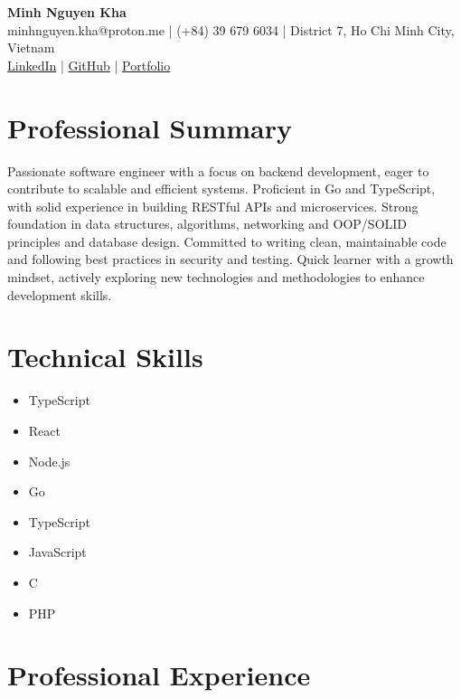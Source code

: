 \documentclass[11pt,a4paper]{article}
\begin{document}
\begin{center}
  {\LARGE \textbf{ Minh Nguyen Kha }}\\[0.2cm]
  minhnguyen.kha@proton.me | (+84) 39 679 6034 | District 7, Ho Chi Minh City, Vietnam\\
  \href{ https://linkedin.com/in/minh-nguyen-kha }{LinkedIn}
   | \href{ https://github.com/MinhNguyenKha02 }{GitHub}
   | \href{ https://your-portfolio.com }{Portfolio}
\end{center}

\vspace{0.3cm}

\section*{Professional Summary}
Passionate software engineer with a focus on backend development, eager to contribute to scalable and efficient systems. Proficient in Go and TypeScript, with solid experience in building RESTful APIs and microservices. Strong foundation in data structures, algorithms, networking and OOP/SOLID principles and database design. Committed to writing clean, maintainable code and following best practices in security and testing. Quick learner with a growth mindset, actively exploring new technologies and methodologies to enhance development skills.

\vspace{0.2cm}

\section*{Technical Skills}
\begin{itemize}[leftmargin=*,noitemsep]
  \item TypeScript
  \item React
  \item Node.js
  \item Go
  \item TypeScript
  \item JavaScript
  \item C
  \item PHP
\end{itemize}

\vspace{0.2cm}

\section*{Professional Experience}
\end{document}
